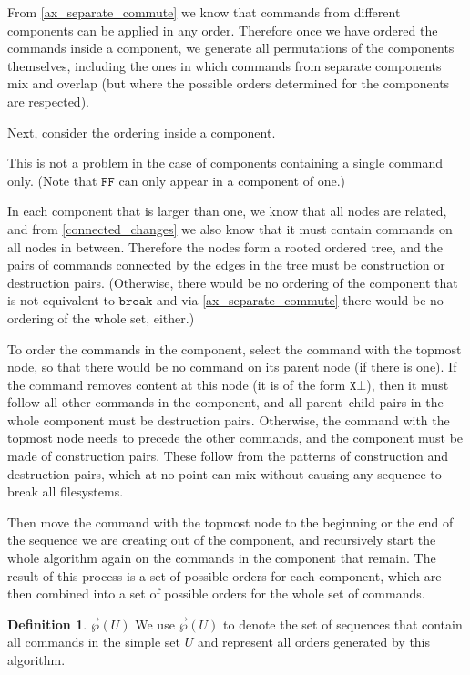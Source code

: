 \documentclass[12pt]{article}
\newcommand{\empt}{\bot}
\newcommand{\cbrk}{\mathtt{break}}
\newcommand{\fscommand}[2]{{#1#2}}
\newcommand{\fsregcommandchar}[1]{\mathtt{#1}}
\newcommand{\fsregcommand}[2]{\fscommand{\fsregcommandchar{#1}}{\fsregcommandchar{#2}}}
\newcommand{\cff}{\fsregcommand{F}{F}}
\newcommand{\orderset}[1]{\vec{\wp}({#1})}
\theoremstyle{definition}
\newtheorem{mydef}{Definition}
\begin{document}
From \cref{ax_separate_commute} we know that commands from different 
components can be applied in any order.
Therefore once we have ordered the commands inside a component, we generate
all permutations of the components themselves, including the ones
in which commands from separate components mix and overlap
(but where the possible orders determined for the components are respected).

Next, consider the ordering inside a component.

This is not a problem in the case of components containing a single command only.
(Note that $\cff$ can only appear in a component of one.)

In each component that is larger than one, 
we know that all nodes are related, and from \cref{connected_changes}
we also know that it must contain commands on all nodes in between.
Therefore the nodes
form a rooted ordered tree,
and the pairs of commands connected by the edges in the tree 
must be construction or destruction pairs.
(Otherwise, there would be no ordering of the component that is not equivalent to $\cbrk$
and via \cref{ax_separate_commute} there would be no ordering of the whole set, either.)

To order the commands in the component,
select the command with the topmost node, so that there would be no command
on its parent node (if there is one). 
If the command removes content at this node (it is of the form $\fsregcommand{X}{\empt}$), 
then it must follow all other commands in the component, and
all parent--child pairs in the whole component must be destruction pairs.
Otherwise, the command with the topmost node needs to precede the other commands,
and the component must be made of construction pairs.
These follow from the patterns of construction and destruction pairs, which
at no point can mix without causing any sequence to break all filesystems.

Then move the command with the topmost node to the beginning or the end of
the sequence we are creating out of the component,
and recursively start the whole algorithm again on the commands in the component that remain.
The result of this process is a set of possible orders for each component,
which are then combined into a set of possible orders for the whole set of commands.

\begin{mydef}{$\orderset{U}$}
We use $\orderset{U}$ to denote the set of sequences that contain all commands in
the simple set $U$
and represent all orders generated by this algorithm.
\end{mydef}
\end{document}
